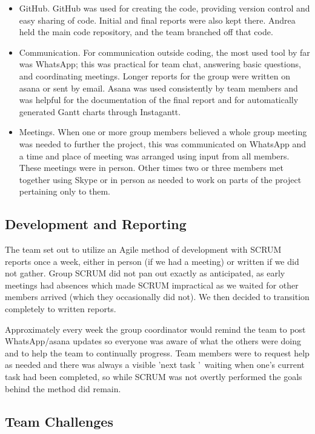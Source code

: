 \documentclass[11pt]{article}
\begin{document}
\begin{enumerate}
\begin{itemize}\itemsep0pt
\item GitHub. GitHub was used for creating the code, providing version control and easy sharing of code. Initial and final reports were also kept there. Andrea held the main code repository, and the team branched off that code.
\item Communication. For communication outside coding, the most used tool by far was WhatsApp; this was practical for team chat, answering basic questions, and coordinating meetings. Longer reports for the group were written on asana or sent by email. Asana was used consistently by team members and was helpful for the documentation of the final report and for automatically generated Gantt charts through Instagantt.
\item Meetings. When one or more group members believed a whole group meeting was needed to further the project, this was communicated on WhatsApp and a time and place of meeting was arranged using input from all members. These meetings were in person. Other times two or three members met together using Skype or in person as needed to work on parts of the project pertaining only to them.
\end{itemize}


\subsection{Development and Reporting}

The team set out to utilize an Agile method of development with SCRUM reports once a week, either in person (if we had a meeting) or written if we did not gather. Group SCRUM did not pan out exactly as anticipated, as early meetings had absences which made SCRUM impractical as we waited for other members arrived (which they occasionally did not). We then decided to transition completely to written reports. 

Approximately every week the group coordinator would remind the team to post WhatsApp/asana updates so everyone was aware of what the others were doing and to help the team to continually progress. Team members were to request help as needed and there was always a visible \textquoteright next task \textquoteright\ waiting when one\textquoteright s current task had been completed, so while SCRUM was not overtly performed the goals behind the method did remain.


\subsection{Team Challenges}


\end{enumerate}
\end{document}
